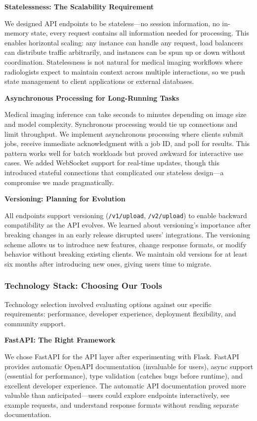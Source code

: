 \documentclass[12pt,a4paper]{article}
\begin{document}
\textbf{Statelessness: The Scalability Requirement}

We designed API endpoints to be stateless—no session information, no in-memory state, every request contains all information needed for processing. This enables horizontal scaling: any instance can handle any request, load balancers can distribute traffic arbitrarily, and instances can be spun up or down without coordination. Statelessness is not natural for medical imaging workflows where radiologists expect to maintain context across multiple interactions, so we push state management to client applications or external databases.

\textbf{Asynchronous Processing for Long-Running Tasks}

Medical imaging inference can take seconds to minutes depending on image size and model complexity. Synchronous processing would tie up connections and limit throughput. We implement asynchronous processing where clients submit jobs, receive immediate acknowledgment with a job ID, and poll for results. This pattern works well for batch workloads but proved awkward for interactive use cases. We added WebSocket support for real-time updates, though this introduced stateful connections that complicated our stateless design—a compromise we made pragmatically.

\textbf{Versioning: Planning for Evolution}

All endpoints support versioning (\texttt{/v1/upload}, \texttt{/v2/upload}) to enable backward compatibility as the API evolves. We learned about versioning's importance after breaking changes in an early release disrupted users' integrations. The versioning scheme allows us to introduce new features, change response formats, or modify behavior without breaking existing clients. We maintain old versions for at least six months after introducing new ones, giving users time to migrate.

\subsubsection{Technology Stack: Choosing Our Tools}

Technology selection involved evaluating options against our specific requirements: performance, developer experience, deployment flexibility, and community support.

\textbf{FastAPI: The Right Framework}

We chose FastAPI for the API layer after experimenting with Flask. FastAPI provides automatic OpenAPI documentation (invaluable for users), async support (essential for performance), type validation (catches bugs before runtime), and excellent developer experience. The automatic API documentation proved more valuable than anticipated—users could explore endpoints interactively, see example requests, and understand response formats without reading separate documentation.
\end{document}
